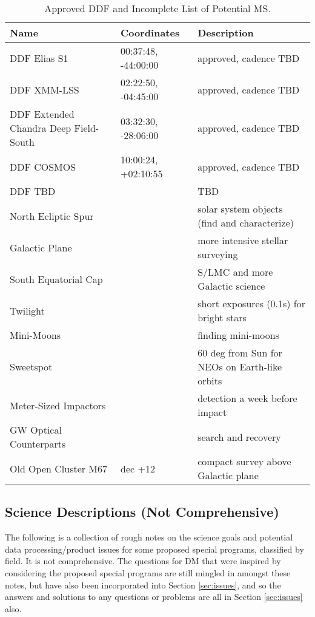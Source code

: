 \documentclass[DM,lsstdraft,toc]{lsstdoc}
\begin{document}
\begin{table}[h]
\begin{center}
\begin{footnotesize}
\caption{Approved DDF and Incomplete List of Potential MS.}
\label{tab:ddfms}
\begin{tabular}{lll}
\hline \hline
Name & Coordinates & Description  \\
\hline
DDF Elias S1    & 00:37:48, -44:00:00  & approved, cadence TBD \\
DDF XMM-LSS & 02:22:50, -04:45:00  & approved, cadence TBD  \\
DDF Extended Chandra Deep Field-South & 03:32:30, -28:06:00  & approved, cadence TBD  \\
DDF COSMOS  & 10:00:24, +02:10:55 & approved, cadence TBD  \\
DDF TBD  & & TBD \\
North Ecliptic Spur      & & solar system objects (find and characterize) \\
Galactic Plane             & & more intensive stellar surveying \\
South Equatorial Cap  & & S/LMC and more Galactic science \\
Twilight                        & & short exposures (0.1s) for bright stars \\
Mini-Moons                     &  & finding mini-moons \\
Sweetspot                       & & 60 deg from Sun for NEOs on Earth-like orbits \\
Meter-Sized Impactors     & & detection a week before impact \\
GW Optical Counterparts & & search and recovery \\
Old Open Cluster M67      & dec +12 & compact survey above Galactic plane  \\
\hline
\end{tabular}
\end{footnotesize}
\end{center}
\end{table}


\subsection{Science Descriptions (Not Comprehensive)}\label{ssec:science_descriptions}

The following is a collection of rough notes on the science goals and potential data processing/product issues for some proposed special programs, classified by field. It is not comprehensive. The questions for DM that were inspired by considering the proposed special programs are still mingled in amongst these notes, but have also been incorporated into Section \ref{sec:issues}, and so the answers and solutions to any questions or problems are all in Section \ref{sec:issues} also.
\end{document}
